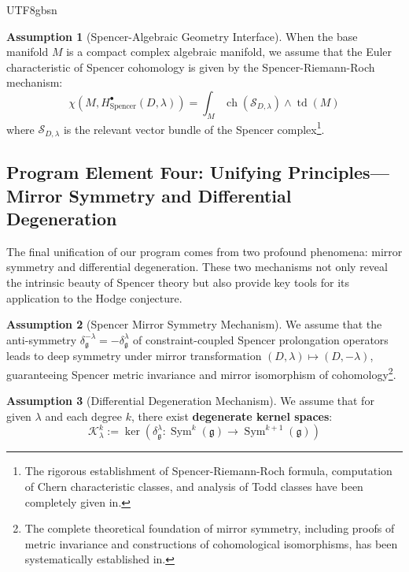 \documentclass[a4paper,12pt]{extarticle}
\theoremstyle{definition}
\newtheorem{assumption}{Assumption}[theorem]
\begin{document}
\begin{CJK}{UTF8}{gbsn}
\begin{assumption}[Spencer-Algebraic Geometry Interface]
\label{assumption:algebraic_interface}
When the base manifold $M$ is a compact complex algebraic manifold, we assume that the Euler characteristic of Spencer cohomology is given by the Spencer-Riemann-Roch mechanism:
\begin{equation}
\label{eq:spencer_riemann_roch}
\chi(M, H^{\bullet}_{\text{Spencer}}(D,\lambda)) = \int_M \operatorname{ch}(\mathcal{S}_{D,\lambda}) \wedge \operatorname{td}(M)
\end{equation}
where $\mathcal{S}_{D,\lambda}$ is the relevant vector bundle of the Spencer complex\footnote{The rigorous establishment of Spencer-Riemann-Roch formula, computation of Chern characteristic classes, and analysis of Todd classes have been completely given in\cite{zheng2025spencer-riemann-roch}.}.
\end{assumption}

\subsection{Program Element Four: Unifying Principles—Mirror Symmetry and Differential Degeneration}
\label{subsec:unifying_principles}

The final unification of our program comes from two profound phenomena: mirror symmetry and differential degeneration. These two mechanisms not only reveal the intrinsic beauty of Spencer theory but also provide key tools for its application to the Hodge conjecture.

\begin{assumption}[Spencer Mirror Symmetry Mechanism]
\label{assumption:mirror_symmetry}
We assume that the anti-symmetry $\delta^{-\lambda}_\mathfrak{g} = -\delta^\lambda_\mathfrak{g}$ of constraint-coupled Spencer prolongation operators leads to deep symmetry under mirror transformation $(D,\lambda) \mapsto (D,-\lambda)$, guaranteeing Spencer metric invariance and mirror isomorphism of cohomology\footnote{The complete theoretical foundation of mirror symmetry, including proofs of metric invariance and constructions of cohomological isomorphisms, has been systematically established in\cite{zheng2025mirror}.}.
\end{assumption}

\begin{assumption}[Differential Degeneration Mechanism]
\label{assumption:differential_degeneration}
We assume that for given $\lambda$ and each degree $k$, there exist \textbf{degenerate kernel spaces}:
\begin{equation}
\label{eq:degenerate_kernel}
\mathcal{K}^k_\lambda := \ker(\delta^\lambda_\mathfrak{g}: \operatorname{Sym}^k(\mathfrak{g}) \to \operatorname{Sym}^{k+1}(\mathfrak{g}))
\end{equation}


\end{assumption}
\end{CJK}
\end{document}
